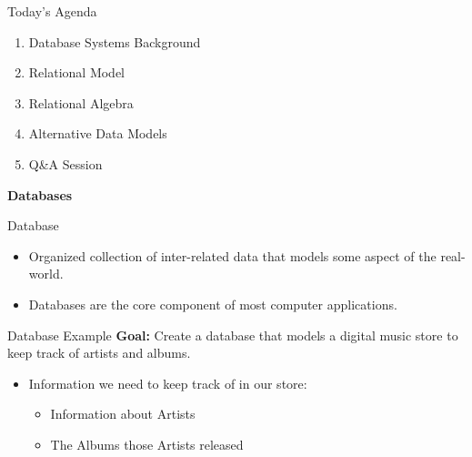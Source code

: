 \begin{frame}{Today's Agenda}
    \begin{enumerate}
        \item Database Systems Background
        \item Relational Model
        \item Relational Algebra
        \item Alternative Data Models
        \item Q\&A Session
    \end{enumerate}
\end{frame}

\begin{frame}
    \centering
    \Huge \textbf{Databases}
\end{frame}

\begin{frame}{Database}
    \Large
    \begin{itemize}
        \item Organized collection of inter-related data that models some aspect of the real-world.
        \item Databases are the core component of most computer applications.
    \end{itemize}
\end{frame}

\begin{frame}{Database Example}
    \textbf{Goal:} Create a database that models a digital music store to keep track of artists and albums.
    \vspace{1em}
    \begin{itemize}
        \item Information we need to keep track of in our store:
        \begin{itemize}
            \item Information about Artists
            \item The Albums those Artists released
        \end{itemize}
    \end{itemize}
\end{frame}

